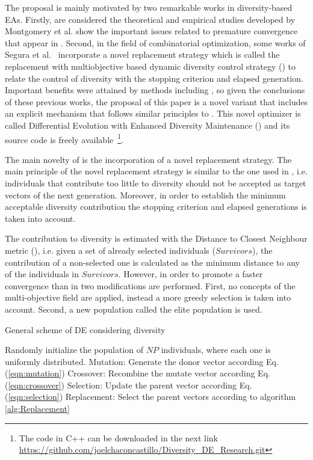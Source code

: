 The proposal is mainly motivated by two remarkable works in diversity-based EAs.
%
Firstly, are considered the theoretical and empirical studies developed by Montgomery et al. \cite{montgomery2012simple} show the 
important issues related to premature convergence that appear in \DE{}.
%
Second, in the field of combinatorial optimization, some works of Segura et al.~\cite{segura2016novel} incorporate a novel replacement strategy
which is called the replacement with multiobjective based dynamic diversity control strategy (\RMDDC{}) to relate the control of diversity
with the stopping criterion and elapsed generation.
%
Important benefits were attained by methods including \RMDDC{}, so given the conclusions of these previous works, the proposal of this paper is a 
novel \DE{} variant that includes an explicit mechanism that follows similar principles to \RMDDC{}.
%
This novel optimizer is called Differential Evolution with Enhanced Diversity Maintenance (\DEEDM{}) and its source
code is freely available~\footnote{The code in C++ can be downloaded in the next link \url{https://github.com/joelchaconcastillo/Diversity\_DE\_Research.git}}.

The main novelty of \DEEDM{} is the incorporation of a novel replacement strategy.
%
The main principle of the novel replacement strategy is similar to the one used in \RMDDC{}, i.e.
individuals that contribute too little to diversity should not be accepted as target vectors of the next generation.
%
Moreover, in order to establish the minimum acceptable diversity contribution the stopping criterion and elapsed
generations is taken into account.

The contribution to diversity is estimated with the Distance to Closest Neighbour metric (\DCN{}), i.e. given
a set of already selected individuals ($Survivors$), the contribution of a non-selected one is calculated as the minimum
distance to any of the individuals in $Survivors$.
%
However, in order to promote a faster convergence than in \RMDDC{} two modifications are performed.
%
First, no concepts of the multi-objective field are applied, instead a more greedy selection is taken into account.
%
Second, a new population called the elite population is used.

\begin{algorithm}[H]
  \scriptsize
	\caption{General scheme of DE considering diversity} 
	\begin{algorithmic}[1]
	\STATE Randomly initialize the population of $NP$ individuals, where each one is uniformly distributed.
		\STATE Mutation: Generate the donor vector according Eq. (\ref{eqn:mutation})
		\STATE Crossover: Recombine the mutate vector according Eq. (\ref{eqn:crossover})
		\STATE Selection: Update the parent vector according  Eq. (\ref{eqn:selection})
		\STATE Replacement: Select the parent vectors according to algorithm \ref{alg:Replacement}
	   \ENDFOR
	\ENDWHILE
    \label{alg:Fase_Remplazo_VSD-MOEAD}
\end{algorithmic}
\end{algorithm}



